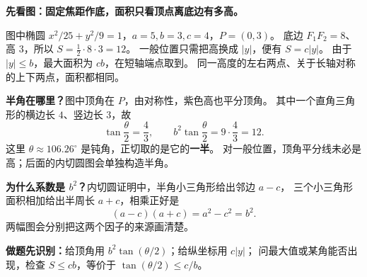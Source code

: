 \clearpage
\begin{explanationbox}
\textbf{先看图：固定焦距作底，面积只看顶点离底边有多高。}

图中椭圆 $x^2/25+y^2/9=1$，$a=5,b=3,c=4$，$P=(0,3)$。
底边 $F_1F_2=8$、高 $3$，所以 $S=\tfrac12\cdot8\cdot3=12$。
一般位置只需把高换成 $|y|$，便有 $\boxed{S=c|y|}$。
由于 $|y|\le b$，最大面积为 $cb$，在短轴端点取到。
同一高度的左右两点、关于长轴对称的上下两点，面积都相同。

\medskip
\textbf{半角在哪里？}图中顶角在 $P$，由对称性，紫色高也平分顶角。
其中一个直角三角形的横边长 $4$、竖边长 $3$，故
\[
 \tan\frac\theta2=\frac43,\qquad
 b^2\tan\frac\theta2=9\cdot\frac43=12.
\]
这里 $\theta\approx106.26^\circ$ 是钝角，正切取的是它的\textbf{一半}。
对一般位置，顶角平分线未必是高；后面的内切圆图会单独构造半角。

\medskip
\textbf{为什么系数是 $b^2$？}内切圆证明中，半角小三角形给出邻边 $a-c$，
三个小三角形面积相加给出半周长 $a+c$，相乘正好是
\[
 (a-c)(a+c)=a^2-c^2=b^2.
\]
两幅图会分别把这两个因子的来源画清楚。

\medskip
\textbf{做题先识别：}给顶角用 $b^2\tan(\theta/2)$；给纵坐标用 $c|y|$；
问最大值或某角能否出现，检查 $S\le cb$，等价于 $\tan(\theta/2)\le c/b$。
\end{explanationbox}
\clearpage
